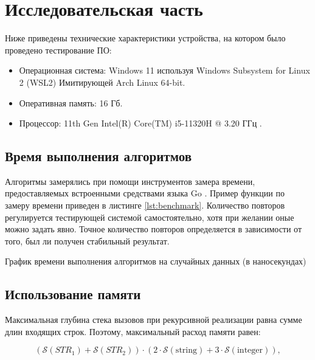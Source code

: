 \chapter{Исследовательская часть}
Ниже приведены технические характеристики устройства, на котором было проведено тестирование ПО:

\begin{itemize}
    \item Операционная система: Windows 11 используя Windows Subsystem for Linux 2 (WSL2) \cite{wsl2} Имитирующей Arch Linux \cite{arch} 64-bit.
    \item Оперативная память: 16 Гб.
    \item Процессор: 11th Gen Intel(R) Core(TM) i5-11320H @ 3.20 ГГц \cite{i5}.
\end{itemize}

\section{Время выполнения алгоритмов}
Алгоритмы замерялись при помощи инструментов замера времени, предоставляемых встроенными средствами языка Go \cite{go}.
Пример функции по замеру времени приведен в листинге \ref{lst:benchmark}.
Количество повторов регулируется тестирующей системой самостоятельно, хотя при желании оные можно задать явно.
Точное количество повторов определяется в зависимости от того, был ли получен стабильный результат.



График времени выполнения алгоритмов на случайных данных (в наносекундах)\newline
%
\section{Использование памяти}

Максимальная глубина стека вызовов при рекурсивной реализации равна сумме длин входящих строк. Поэтому, максимальный расход памяти равен:

\begin{equation}
(\mathcal{S}(STR_1) + \mathcal{S}(STR_2)) \cdot (2 \cdot \mathcal{S}\mathrm{(string)} + 3 \cdot \mathcal{S}\mathrm{(integer)}),
\end{equation}

